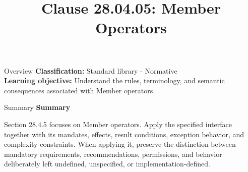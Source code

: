 \documentclass[10pt,letterpaper]{article}
\title{Clause 28.04.05: Member Operators}
\author{}
\date{}
\begin{document}
\maketitle
\begin{CornellOverviewBox}{Overview}
\textbf{Classification:} Standard library - Normative\\[2pt]
\textbf{Learning objective:} Understand the rules, terminology, and semantic consequences associated with Member operators.
\end{CornellOverviewBox}\begin{CornellSummaryBox}{Summary}
{\sffamily\bfseries\color{Accent} Summary}\par\vspace{3pt}Section 28.4.5 focuses on Member operators. Apply the specified interface together with its mandates, effects, result conditions, exception behavior, and complexity constraints. When applying it, preserve the distinction between mandatory requirements, recommendations, permissions, and behavior deliberately left undefined, unspecified, or implementation-defined.
\end{CornellSummaryBox}
\end{document}
